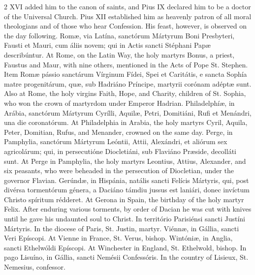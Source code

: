 \begin{paracol}{2}
 XVI added him to the canon of saints, and Pius IX declared him to be a 
 doctor of the Universal Church. Pius XII established him as heavenly 
 patron of all moral theologians and of those who hear Confession. His 
 feast, however, is observed on the day following.
\switchcolumn*
{}
Romæ, via Latína, sanctórum Mártyrum Boni Presbyteri, Fausti et Mauri, cum áliis novem; qui in 
 Actis sancti Stéphani Papæ describúntur.
\switchcolumn
{}
At Rome, on the Latin Way, the holy 
 martyrs Bonus, a priest, Faustus and Maur, with nine others, mentioned in 
 the Acts of Pope St. Stephen.
\switchcolumn*
{}
Item Romæ pássio 
 sanctárum Vírginum Fídei, Spei et Caritátis, e sancta Sophía matre 
 progenitárum, quæ, sub Hadriáno Príncipe, martyrii corónam adéptæ sunt.
\switchcolumn
{}
Also at Rome, the holy virgins 
 Faith, Hope, and Charity, children of St. Sophia, who won the crown of 
 martyrdom under Emperor Hadrian.
\switchcolumn*
{}
Philadelphíæ, in 
 Arábia, sanctórum Mártyrum Cyrílli, Aquilæ, Petri, Domitiáni, Rufi et 
 Menándri, una die coronatórum.
\switchcolumn
{}
At Philadelphia in Arabia, the holy 
 martyrs Cyril, Aquila, Peter, Domitian, Rufus, and Menander, crowned on the 
 same day.
\switchcolumn*
{}
Perge, in Pamphylia, 
 sanctórum Mártyrum Leóntii, Attii, Alexándri, et aliórum sex agricolárum; 
 qui, in persecutióne Diocletiáni, sub Flaviáno Præside, decolláti sunt.
\switchcolumn
{}
At Perge in Pamphylia, the holy 
 martyrs Leontius, Attius, Alexander, and six peasants, who were beheaded in 
 the persecution of Diocletian, under the governor Flavian.
\switchcolumn*
{}
Gerúndæ, in Hispánia, 
 natális sancti Felícis Mártyris, qui, post divérsa tormentórum génera, a Daciáno támdiu jussus est laniári, donec invíctum Christo spíritum rédderet.
\switchcolumn
{}
At Gerona in Spain, the birthday of 
 the holy martyr Felix. After enduring various torments, by order of 
 Dacian he was cut with knives until he gave his undaunted soul to Christ.
\switchcolumn*
{}
In território Parisiénsi sancti Justíni Mártyris.
\switchcolumn
{}
In the diocese of Paris, St. Justin, 
 martyr.
\switchcolumn*
{}
Viénnæ, in Gállia, 
 sancti Veri Epíscopi.
\switchcolumn
{}
At Vienne in France, St. Verus, 
 bishop.
\switchcolumn*
{}
Wintóniæ, in Anglia, 
 sancti Ethelwóldi Epíscopi.
\switchcolumn
{}
At Winchester in England, St. 
 Ethelwold, bishop.
\switchcolumn*
{}
In pago Lisuíno, in 
 Gállia, sancti Nemésii Confessóris.
\switchcolumn
{}
In the country of Lisieux, St. 
 Nemesius, confessor.
\switchcolumn*
{}
\end{paracol}

